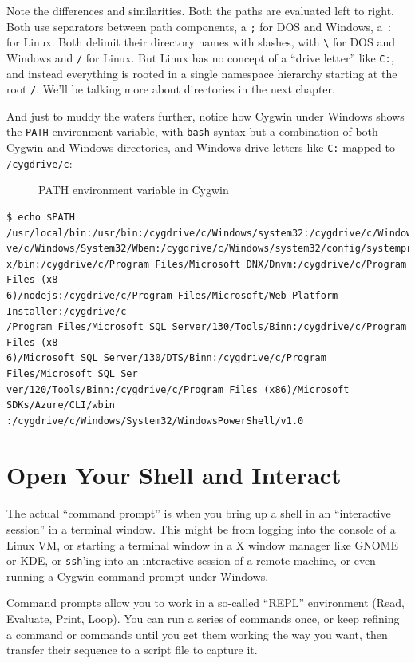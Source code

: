 \documentclass[10pt,]{book}
\numberwithin{figure}{chapter}
\DeclareRobustCommand{\drcap}[1]{\begin{figure}[H]\caption{#1}\end{figure}}
\DeclareRobustCommand{\drcmd}[1]{\index{Commands!#1}}
\DeclareRobustCommand{\drshl}[1]{\index{Shells!#1}}
\begin{document}
Note the differences and similarities. Both the paths are evaluated left
to right. Both use separators between path components, a \texttt{;} for
DOS and Windows, a \texttt{:} for Linux. Both delimit their directory
names with slashes, with \texttt{\textbackslash{}} for DOS and Windows
and \texttt{/} for Linux. But Linux has no concept of a ``drive letter''
like \texttt{C:}, and instead everything is rooted in a single namespace
hierarchy starting at the root \texttt{/}. We'll be talking more about
directories in the next chapter.

And just to muddy the waters further, notice how Cygwin\drshl{Cygwin}
under Windows shows the \texttt{PATH} environment variable, with
\texttt{bash} syntax but a combination of both Cygwin and Windows
directories, and Windows drive letters like \texttt{C:} mapped to
\texttt{/cygdrive/c}:

\drcap{PATH environment variable in Cygwin}

\begin{verbatim}
$ echo $PATH
/usr/local/bin:/usr/bin:/cygdrive/c/Windows/system32:/cygdrive/c/Windows:/cygdri
ve/c/Windows/System32/Wbem:/cygdrive/c/Windows/system32/config/systemprofile/.dn
x/bin:/cygdrive/c/Program Files/Microsoft DNX/Dnvm:/cygdrive/c/Program Files (x8
6)/nodejs:/cygdrive/c/Program Files/Microsoft/Web Platform Installer:/cygdrive/c
/Program Files/Microsoft SQL Server/130/Tools/Binn:/cygdrive/c/Program Files (x8
6)/Microsoft SQL Server/130/DTS/Binn:/cygdrive/c/Program Files/Microsoft SQL Ser
ver/120/Tools/Binn:/cygdrive/c/Program Files (x86)/Microsoft SDKs/Azure/CLI/wbin
:/cygdrive/c/Windows/System32/WindowsPowerShell/v1.0
\end{verbatim}

\section{Open Your Shell and
Interact}\label{open-your-shell-and-interact}

The actual ``command prompt'' is when you bring up a shell in an
``interactive session'' in a terminal window. This might be from logging
into the console of a Linux VM, or starting a terminal window in a X
window manager like GNOME or KDE, or \texttt{ssh}'ing\drcmd{ssh} into an
interactive session of a remote machine, or even running a Cygwin
command prompt under Windows.

Command prompts allow you to work in a so-called ``REPL'' environment
(Read, Evaluate, Print, Loop). You can run a series of commands once, or
keep refining a command or commands until you get them working the way
you want, then transfer their sequence to a script file to capture it.
\end{document}
